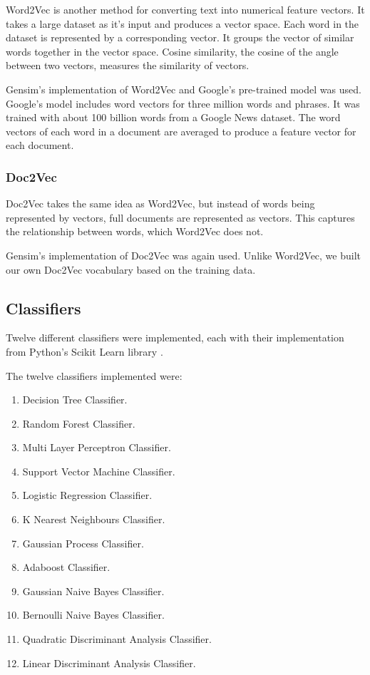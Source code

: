 Word2Vec is another method for converting text into numerical feature vectors. It takes a large dataset as it's input and produces a vector space. Each word in the dataset is represented by a corresponding vector. It groups the vector of similar words together in the vector space. Cosine similarity, the cosine of the angle between two vectors, measures the similarity of vectors. 

Gensim's implementation of Word2Vec and Google's pre-trained model was used. Google's model includes word vectors for three million words and phrases. It was trained with about 100 billion words from a Google News dataset. The word vectors of each word in a document are averaged to produce a feature vector for each document.

\subsubsection*{Doc2Vec}

Doc2Vec takes the same idea as Word2Vec, but instead of words being represented by vectors, full documents are represented as vectors. This captures the relationship between words, which Word2Vec does not.

Gensim's implementation of Doc2Vec was again used. Unlike Word2Vec, we built our own Doc2Vec vocabulary based on the training data.

\subsection*{Classifiers}

Twelve different classifiers were implemented, each with their implementation from Python's Scikit Learn library \cite{scikit-learn}.

The twelve classifiers implemented were:
\begin{enumerate}
    \item Decision Tree Classifier.
    \item Random Forest Classifier.
    \item Multi Layer Perceptron Classifier.
    \item Support Vector Machine Classifier.
    \item Logistic Regression Classifier.
    \item K Nearest Neighbours Classifier.
    \item Gaussian Process Classifier.
    \item Adaboost Classifier.
    \item Gaussian Naive Bayes Classifier.
    \item Bernoulli Naive Bayes Classifier.
    \item Quadratic Discriminant Analysis Classifier.
    \item Linear Discriminant Analysis Classifier.
\end{enumerate}

